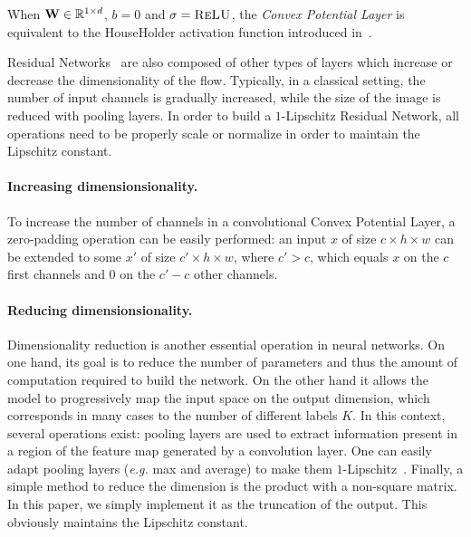 \begin{rmq}
When $\mathbf{W}\in\mathbb{R}^{1\times d}$, $b =0$ and $\sigma=\textsc{ReLU}$, the \emph{Convex Potential Layer} is equivalent to the HouseHolder activation function introduced in~\citet{singla2021householder}.
\end{rmq}

Residual Networks~\citep{he2016deep} are also composed of other types of layers which increase or decrease the dimensionality of the flow.
Typically, in a classical setting, the number of input channels is gradually increased, while the size of the image is reduced with pooling layers.
In order to build a $1$-Lipschitz Residual Network, all operations need to be properly scale or normalize in order to maintain the Lipschitz constant.

\paragraph{Increasing dimensionsionality.} To increase the number of channels in a convolutional Convex Potential Layer, a zero-padding operation can be easily performed: an input $x$ of size $c\times h \times w$ can be extended to some $x'$ of size  $c'\times h \times w$, where $c'>c$, which equals $x$ on the $c$ first channels and $0$ on the $c'-c$ other channels.
\paragraph{Reducing dimensionsionality.} Dimensionality reduction is another essential operation in neural networks. On one hand, its  goal is to  reduce the number of parameters and thus the amount of computation required to build the network. On the other hand it allows the model to progressively map the input space on the output dimension, which corresponds in many cases to the number of different labels $K$. 
In this context, several operations exist:
pooling layers are used to extract information present in a region of the feature map generated by a convolution layer. One can easily adapt pooling layers (\emph{e.g.} max and average) to make them $1$-Lipschitz~\citep{bartlett2017spectrally}.
Finally, a simple method to reduce the dimension is the product with a non-square matrix. In this paper, we simply implement it as  the truncation of the output. This obviously maintains the Lipschitz constant.


